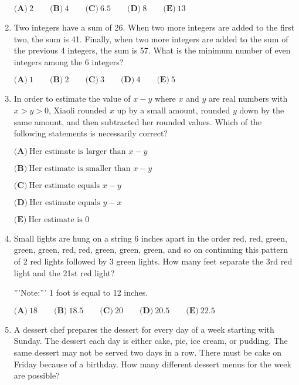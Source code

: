 \documentclass{article}
\begin{document}
\begin{enumerate}[label=\arabic*., itemsep=0.5em]
\(\textbf{(A)}\ 2\qquad\textbf{(B)}\ 4\qquad\textbf{(C)}\ 6.5\qquad\textbf{(D)}\ 8\qquad\textbf{(E)}\ 13\)\par \vspace{0.5em}\item Two integers have a sum of 26. When two more integers are added to the first two, the sum is 41. Finally, when two more integers are added to the sum of the previous 4 integers, the sum is 57. What is the minimum number of even integers among the 6 integers? 

\(\textbf{(A)}\ 1\qquad\textbf{(B)}\ 2\qquad\textbf{(C)}\ 3\qquad\textbf{(D)}\ 4\qquad\textbf{(E)}\ 5\)\par \vspace{0.5em}\item In order to estimate the value of \(x-y\) where \(x\) and \(y\) are real numbers with \(x > y > 0\), Xiaoli rounded \(x\) up by a small amount, rounded \(y\) down by the same amount, and then subtracted her rounded values. Which of the following statements is necessarily correct?

\(\textbf{(A)}\ \text{Her estimate is larger than }x-y\)

\(\textbf{(B)}\ \text{Her estimate is smaller than }x-y\)

\(\textbf{(C)}\ \text{Her estimate equals }x-y\)

\(\textbf{(D)}\ \text{Her estimate equals }y - x\)

\(\textbf{(E)}\ \text{Her estimate is 0}\)\par \vspace{0.5em}\item Small lights are hung on a string 6 inches apart in the order red, red, green, green, green, red, red, green, green, green, and so on continuing this pattern of 2 red lights followed by 3 green lights. How many feet separate the 3rd red light and the 21st red light?

'''Note:''' 1 foot is equal to 12 inches.

\(\textbf{(A)}\ 18\qquad\textbf{(B)}\ 18.5\qquad\textbf{(C)}\ 20\qquad\textbf{(D)}\ 20.5\qquad\textbf{(E)}\ 22.5 \)\par \vspace{0.5em}\item A dessert chef prepares the dessert for every day of a week starting with Sunday. The dessert each day is either cake, pie, ice cream, or pudding. The same dessert may not be served two days in a row. There must be cake on Friday because of a birthday. How many different dessert menus for the week are possible?


\end{enumerate}
\end{document}
